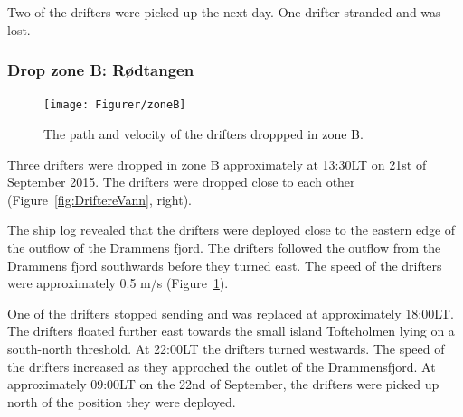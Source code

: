 \documentclass[12pt,a4paper,english]{article}
\begin{document}
Two of the drifters were picked up the next day. One drifter stranded and was lost. 

\subsubsection{Drop zone B: R\o dtangen}
%
\begin{figure}[ht]
\centerline{
\texttt{[image: Figurer/zoneB]}}
\caption{\small
The path and velocity of the drifters droppped in zone B.}
\label{fig:ZoneB}
\end{figure}
%
%
Three drifters were dropped in zone B approximately at 13:30LT on 21st of September 2015. The drifters were dropped close to each other (Figure~\ref{fig:DriftereVann}, right).

The ship log revealed that the drifters were deployed close to the eastern edge of the outflow of the Drammens fjord. The drifters followed the outflow from the Drammens fjord southwards before they turned east. The speed of the drifters were approximately 0.5 m/s (Figure~\ref{fig:ZoneB}). %

One of the drifters stopped sending and was replaced at approximately 18:00LT. The drifters floated further east towards the small island Tofteholmen lying on a south-north threshold. At 22:00LT the drifters turned westwards. The speed of the drifters increased as they approched the outlet of the Drammensfjord.%
At approximately 09:00LT on the 22nd of September, the drifters were picked up north of the position they were deployed.

\end{document}
